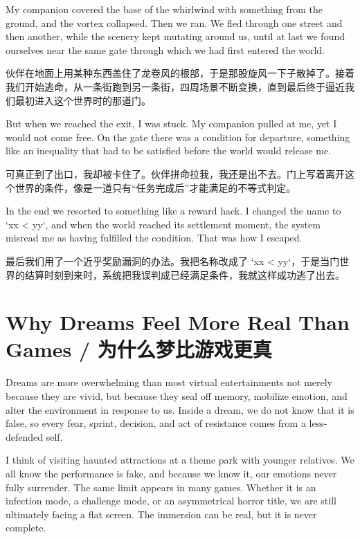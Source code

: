 My companion covered the base of the whirlwind with something from the ground, and the vortex collapsed. Then we ran. We fled through one street and then another, while the scenery kept mutating around us, until at last we found ourselves near the same gate through which we had first entered the world.

\begin{translationbox}
伙伴在地面上用某种东西盖住了龙卷风的根部，于是那股旋风一下子散掉了。接着我们开始逃命，从一条街跑到另一条街，四周场景不断变换，直到最后终于逼近我们最初进入这个世界时的那道门。
\end{translationbox}

But when we reached the exit, I was stuck. My companion pulled at me, yet I would not come free. On the gate there was a condition for departure, something like an inequality that had to be satisfied before the world would release me.

\begin{translationbox}
可真正到了出口，我却被卡住了。伙伴拼命拉我，我还是出不去。门上写着离开这个世界的条件，像是一道只有“任务完成后”才能满足的不等式判定。
\end{translationbox}

In the end we resorted to something like a reward hack. I changed the name to `xx < yy`, and when the world reached its settlement moment, the system misread me as having fulfilled the condition. That was how I escaped.

\begin{translationbox}
最后我们用了一个近乎奖励漏洞的办法。我把名称改成了 `xx < yy`，于是当门世界的结算时刻到来时，系统把我误判成已经满足条件，我就这样成功逃了出去。
\end{translationbox}

\section{Why Dreams Feel More Real Than Games / 为什么梦比游戏更真}

\begin{reflectionbox}
Dreams are more overwhelming than most virtual entertainments not merely because they are vivid, but because they seal off memory, mobilize emotion, and alter the environment in response to us.
Inside a dream, we do not know that it is false, so every fear, sprint, decision, and act of resistance comes from a less-defended self.
\end{reflectionbox}

I think of visiting haunted attractions at a theme park with younger relatives. We all know the performance is fake, and because we know it, our emotions never fully surrender. The same limit appears in many games. Whether it is an infection mode, a challenge mode, or an asymmetrical horror title, we are still ultimately facing a flat screen. The immersion can be real, but it is never complete.

